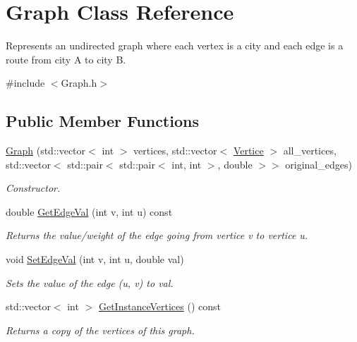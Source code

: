 \hypertarget{classGraph}{}\section{Graph Class Reference}
\label{classGraph}


Represents an undirected graph where each vertex is a city and each edge is a route from city A to city B.  




{\ttfamily \#include $<$Graph.\+h$>$}

\subsection*{Public Member Functions}
\begin{DoxyCompactItemize}
\item 
\hyperlink{classGraph_a47d82684ef5ee46d7117c028d277c91a}{Graph} (std\+::vector$<$ int $>$ vertices, std\+::vector$<$ \hyperlink{classVertice}{Vertice} $>$ all\+\_\+vertices, std\+::vector$<$ std\+::pair$<$ std\+::pair$<$ int, int $>$, double $>$$>$ original\+\_\+edges)
\begin{DoxyCompactList}\small\item\em Constructor. \end{DoxyCompactList}\item 
double \hyperlink{classGraph_aadc5562fe6ff94a8cc787fd935b79dc1}{Get\+Edge\+Val} (int v, int u) const
\begin{DoxyCompactList}\small\item\em Returns the value/weight of the edge going from vertice v to vertice u. \end{DoxyCompactList}\item 
void \hyperlink{classGraph_aaaa599eab87163d7cee7cdced6193367}{Set\+Edge\+Val} (int v, int u, double val)
\begin{DoxyCompactList}\small\item\em Sets the value of the edge (u, v) to val. \end{DoxyCompactList}\item 
\mbox{\label{classGraph_adc73f5e5a078fd83afd0184afd272b79}} 
std\+::vector$<$ int $>$ \hyperlink{classGraph_adc73f5e5a078fd83afd0184afd272b79}{Get\+Instance\+Vertices} () const
\begin{DoxyCompactList}\small\item\em Returns a copy of the vertices of this graph. \end{DoxyCompactList}\item 
$$
\end{DoxyCompactItemize}
